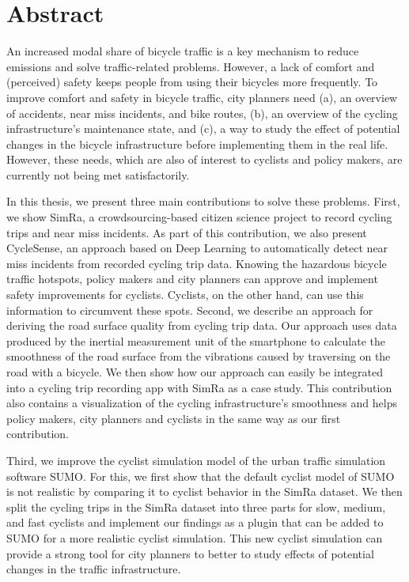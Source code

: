 
\cleardoublepage
{}
\section*{Abstract}
An increased modal share of bicycle traffic is a key mechanism to reduce emissions and solve traffic-related problems.
However, a lack of comfort and (perceived) safety keeps people from using their bicycles more frequently.
To improve comfort and safety in bicycle traffic, city planners need (a), an overview of accidents, near miss incidents, and bike routes, (b), an overview of the cycling infrastructure's maintenance state, and (c), a way to study the effect of potential changes in the bicycle infrastructure before implementing them in the real life.
However, these needs, which are also of interest to cyclists and policy makers, are currently not being met satisfactorily.

In this thesis, we present three main contributions to solve these problems.
First, we show SimRa, a crowdsourcing-based citizen science project to record cycling trips and near miss incidents.
As part of this contribution, we also present CycleSense, an approach based on Deep Learning to automatically detect near miss incidents from recorded cycling trip data.
Knowing the hazardous bicycle traffic hotspots, policy makers and city planners can approve and implement safety improvements for cyclists.
Cyclists, on the other hand, can use this information to circumvent these spots.
Second, we describe an approach for deriving the road surface quality from cycling trip data.
Our approach uses data produced by the inertial measurement unit of the smartphone to calculate the smoothness of the road surface from the vibrations caused by traversing on the road with a bicycle. 
We then show how our approach can easily be integrated into a cycling trip recording app with SimRa as a case study.
This contribution also contains a visualization of the cycling infrastructure's smoothness and helps policy makers, city planners and cyclists in the same way as our first contribution.

Third, we improve the cyclist simulation model of the urban traffic simulation software SUMO.
For this, we first show that the default cyclist model of SUMO is not realistic by comparing it to cyclist behavior in the SimRa dataset.
We then split the cycling trips in the SimRa dataset into three parts for slow, medium, and fast cyclists and implement our findings as a plugin that can be added to SUMO for a more realistic cyclist simulation.
This new cyclist simulation can provide a strong tool for city planners to better to study effects of potential changes in the traffic infrastructure. 


